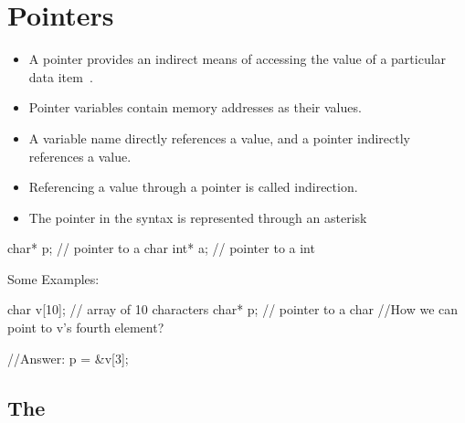 \section{Pointers}
\label{sec:Pointers}

\begin{itemize}
    \item A pointer provides an indirect means of accessing the value of a particular data item~\cite{kochan2005programmingC}. 
    \item Pointer variables contain memory addresses as their values. 
    \item A variable name directly references a value, and a pointer indirectly references a value.
    \item Referencing a value through a pointer is called indirection.
    \item The pointer in the syntax is represented through an asterisk \textquotesingle\CppCommonCode{*}\textquotesingle
\end{itemize}

\begin{minipage}{\MPWxXSSxLISTING\textwidth} %
{} %
\begin{CPPCode}
char* p;        // pointer to a char
int*  a;        // pointer to a int
\end{CPPCode}
\end{minipage}

\noindent Some Examples:\\
\begin{minipage}{\MPWxXSxLISTING\textwidth} %
{} %
\begin{CPPCode}
char v[10];     // array of 10 characters
char* p;        // pointer to a char
//How we can point to v's fourth element?
\end{CPPCode}
\end{minipage}
\begin{minipage}{\MPWxXXSxLISTING\textwidth} %
{} %
\begin{CPPCode}
//Answer:
p = &v[3];
\end{CPPCode}
\end{minipage}

\subsection{The }
\label{subsec:nullptr}

